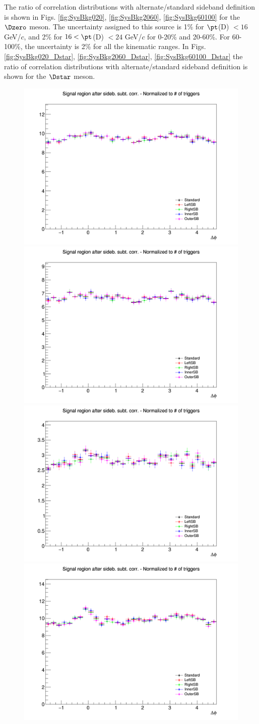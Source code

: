 The ratio of correlation distributions with alternate/standard sideband definition is shown in Figs. \ref{fig:SysBkg020}, \ref{fig:SysBkg2060}, \ref{fig:SysBkg60100} for the $\Dzero$ meson. The uncertainty assigned to this source is 1\% for $\pt$(D) $< 16$ GeV/$c$, and 2\% for $16 < \pt$(D) $< 24$ GeV/$c$ for 0-20\% and 20-60\%. For 60-100\%, the uncertainty is 2\% for all the kinematic ranges.
In Figs. \ref{fig:SysBkg020_Dstar}, \ref{fig:SysBkg2060_Dstar}, \ref{fig:SysBkg60100_Dstar} the ratio of correlation distributions with alternate/standard sideband definition is shown for the $\Dstar$ meson.

\begin{figure}
\centering
{\includegraphics[width=0.31\linewidth]{figuresVsCent/Dzero/SystSideb/020/AzimCorrDistr_Dzero_Canvas_PtIntBins4to5_PoolInt_thr03to99_Superimp.png}}
{\includegraphics[width=0.31\linewidth]{figuresVsCent/Dzero/SystSideb/020/AzimCorrDistr_Dzero_Canvas_PtIntBins4to5_PoolInt_thr03to1_Superimp.png}}
{\includegraphics[width=0.31\linewidth]{figuresVsCent/Dzero/SystSideb/020/AzimCorrDistr_Dzero_Canvas_PtIntBins4to5_PoolInt_thr1to99_Superimp.png}} \\
{\includegraphics[width=0.31\linewidth]{figuresVsCent/Dzero/SystSideb/020/AzimCorrDistr_Dzero_Canvas_PtIntBins6to8_PoolInt_thr03to99_Superimp.png}}

\end{figure}
